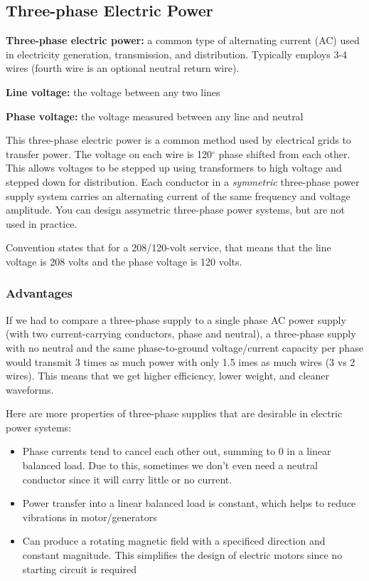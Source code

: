 \subsection{Three-phase Electric Power}
\begin{define}
    \textbf{Three-phase electric power:} a common type of alternating current (AC) used in electricity generation, transmission, and distribution. Typically employs 3-4 wires (fourth wire is an optional neutral return wire).

    \textbf{Line voltage:} the voltage between any two lines

    \textbf{Phase voltage:} the voltage measured between any line and neutral
\end{define}
This three-phase electric power is a common method used by electrical grids to transfer power. The voltage on each wire is 120$^\circ$ phase shifted from each other. This allows voltages to be stepped up using transformers to high voltage and stepped down for distribution. Each conductor in a \textit{symmetric} three-phase power supply system carries an alternating current of the same frequency and voltage amplitude. You can design assymetric three-phase power systems, but are not used in practice.

Convention states that for a 208/120-volt service, that means that the line voltage is 208 volts and the phase voltage is 120 volts.

\subsubsection{Advantages}
If we had to compare a three-phase supply to a single phase AC power supply (with two current-carrying conductors, phase and neutral), a three-phase supply with no neutral and the same phase-to-ground voltage/current capacity per phase would transmit 3 times as much power with only 1.5 imes as much wires (3 vs 2 wires). This means that we get higher efficiency, lower weight, and cleaner waveforms.

Here are more properties of three-phase supplies that are desirable in electric power systems:
\begin{itemize}
    \item Phase currents tend to cancel each other out, summing to 0 in a linear balanced load. Due to this, sometimes we don't even need a neutral conductor since it will carry little or no current.
    \item Power transfer into a linear balanced load is constant, which helps to reduce vibrations in motor/generators
    \item Can produce a rotating magnetic field with a specificed direction and constant magnitude. This simplifies the design of electric motors since no starting circuit is required
\end{itemize}

